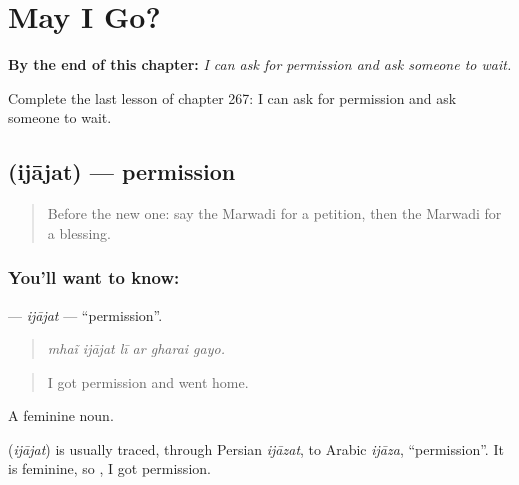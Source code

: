 
\chapter{May I Go?}
\label{ch:mw-may-i-go}

\begin{chapteropening}
\textbf{By the end of this chapter:} \emph{I can ask for permission and ask someone to wait.}

Complete the last lesson of chapter 267: I can ask for permission and ask someone to wait.
\end{chapteropening}

\section[\texorpdfstring{\mw{इजाजत} (ijājat)}{इजाजत (ijājat)}]{ (ijājat) — permission}

\label{lesson:MW-C267-ijajat}



\begin{quote}
Before the new one: say the Marwadi for a petition, then the Marwadi for a blessing.
\end{quote}

\subsection*{You'll want to know: }
\textbf{} — \emph{ijājat} — \textquotedblleft{}permission\textquotedblright{}.

\begin{quote}
     
\end{quote}

\begin{quote}
\emph{mhaĩ ijājat lī ar gharai gayo.}
\end{quote}

\begin{quote}
I got permission and went home.
\end{quote}

A feminine noun.

\begin{cousinweb}
\textbf{} (\emph{ijājat}) is usually traced, through Persian \emph{ijāzat}, to Arabic \emph{ijāza}, \textquotedblleft{}permission\textquotedblright{}. It is feminine, so \textbf{  }, I got permission.
\end{cousinweb}

